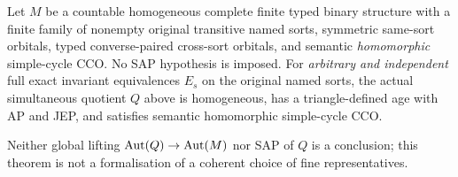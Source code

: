 \begin{theorem}
\label{thm:typed-simultaneous-exact-quotients}
Let $M$ be a countable homogeneous complete finite typed binary
structure with a finite family of nonempty original transitive
named sorts, symmetric same-sort orbitals, typed converse-paired
cross-sort orbitals, and semantic \emph{homomorphic} simple-cycle
CCO.  No SAP hypothesis is imposed.  For \emph{arbitrary and
independent} full exact invariant equivalences $E_s$ on the
original named sorts, the actual simultaneous quotient $Q$ above
is homogeneous, has a triangle-defined age with AP and JEP,
and satisfies semantic homomorphic simple-cycle CCO.

Neither global lifting $\operatorname{Aut}(Q)\to\operatorname{Aut}(M)$ nor SAP of $Q$ is a
conclusion; this theorem is not a formalisation of a coherent
choice of fine representatives.
\end{theorem}
